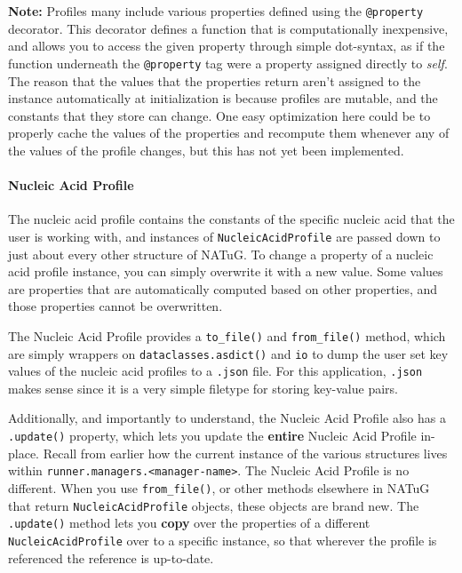 \documentclass[titlepage]{article}
\begin{document}
	\textbf{Note:} Profiles many include various properties defined using the \texttt{@property} decorator. This decorator defines a function that is computationally inexpensive, and allows you to access the given property through simple dot-syntax, as if the function underneath the \texttt{@property} tag were a property assigned directly to \textit{self}. The reason that the values that the properties return aren't assigned to the instance automatically at initialization is because profiles are mutable, and the constants that they store can change. One easy optimization here could be to properly cache the values of the properties and recompute them whenever any of the values of the profile changes, but this has not yet been implemented. 
	
	\paragraph{Nucleic Acid Profile} 
	The nucleic acid profile contains the constants of the specific nucleic acid that the user is working with, and instances of \texttt{NucleicAcidProfile} are passed down to just about every other structure of NATuG. To change a property of a nucleic acid profile instance, you can simply overwrite it with a new value. Some values are properties that are automatically computed based on other properties, and those properties cannot be overwritten.
	
	The Nucleic Acid Profile provides a \texttt{to\_file()} and \texttt{from\_file()} method, which are simply wrappers on \texttt{dataclasses.asdict()} and \texttt{io} to dump the user set key values of the nucleic acid profiles to a \texttt{.json} file. For this application, \texttt{.json} makes sense since it is a very simple filetype for storing key-value pairs.
	
	Additionally, and importantly to understand, the Nucleic Acid Profile also has a \texttt{.update()} property, which lets you update the \textbf{entire} Nucleic Acid Profile in-place. Recall from earlier how the current instance of the various structures lives within \texttt{runner.managers.<manager-name>}. The Nucleic Acid Profile is no different. When you use \texttt{from\_file()}, or other methods elsewhere in NATuG that return \texttt{NucleicAcidProfile} objects, these objects are brand new. The \texttt{.update()} method lets you \textbf{copy} over the properties of a different \texttt{NucleicAcidProfile} over to a specific instance, so that wherever the profile is referenced the reference is up-to-date. 
	
\end{document}
